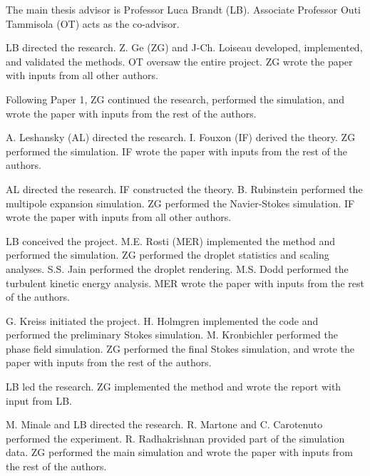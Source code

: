 \begin{divisionofwork}
	The main thesis advisor is Professor Luca Brandt (LB).
	Associate Professor Outi Tammisola (OT) acts as the co-advisor.

	\paperitem
                LB directed the research.
                Z. Ge (ZG) and J-Ch. Loiseau developed, implemented, and validated the methods.
                OT oversaw the entire project.
		ZG wrote the paper with inputs from all other authors.

	\paperitem
                Following Paper 1, ZG continued the research, performed the simulation,
                and wrote the paper with inputs from the rest of the authors.

	\paperitem
                A. Leshansky (AL) directed the research.
                I. Fouxon (IF) derived the theory.
		ZG performed the simulation.
                IF wrote the paper with inputs from the rest of the authors.

	\paperitem
                AL directed the research.
                IF constructed the theory.
		B. Rubinstein performed the multipole expansion simulation.
                ZG performed the Navier-Stokes simulation.
                IF wrote the paper with inputs from all other authors.

	\paperitem
                LB conceived the project.
                M.E. Rosti (MER) implemented the method and performed the simulation.
		ZG performed the droplet statistics and scaling analyses.
                S.S. Jain performed the droplet rendering.
                M.S. Dodd performed the turbulent kinetic energy analysis.
                MER wrote the paper with inputs from the rest of the authors.

	\paperitem
                G. Kreiss initiated the project.
                H. Holmgren implemented the code and performed the preliminary Stokes simulation.
                M. Kronbichler performed the phase field simulation.
		ZG performed the final Stokes simulation, and 
                wrote the paper with inputs from the rest of the authors.

	\paperitem
                LB led the research.
		ZG implemented the method and wrote the report with input from LB.

	\paperitem
                M. Minale and LB directed the research.
                R. Martone and C. Carotenuto performed the experiment.
                R. Radhakrishnan provided part of the simulation data.
		ZG performed the main simulation and wrote the paper with inputs from the rest of the authors.

               

\end{divisionofwork}



